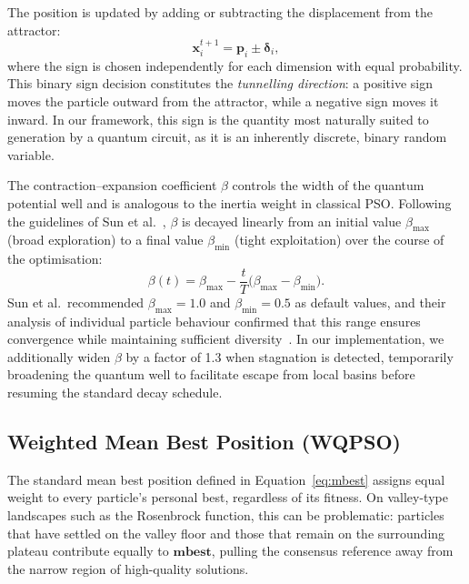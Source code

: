 The position is updated by adding or subtracting the displacement from the
attractor:
\begin{equation}
  \mathbf{x}_i^{t+1} = \mathbf{p}_i \pm \boldsymbol{\delta}_i,
  \label{eq:qpso_update}
\end{equation}
where the sign is chosen independently for each dimension with equal
probability.  This binary sign decision constitutes the \emph{tunnelling
direction}: a positive sign moves the particle outward from the attractor,
while a negative sign moves it inward.  In our framework, this sign is the
quantity most naturally suited to generation by a quantum circuit, as it is an
inherently discrete, binary random variable.

The contraction--expansion coefficient $\beta$ controls the width of the
quantum potential well and is analogous to the inertia weight in classical PSO.
Following the guidelines of Sun et al.~\cite{Sun2012}, $\beta$ is decayed
linearly from an initial value $\beta_{\max}$ (broad exploration) to a final
value $\beta_{\min}$ (tight exploitation) over the course of the optimisation:
\begin{equation}
  \beta(t) = \beta_{\max}
    - \frac{t}{T}\bigl(\beta_{\max} - \beta_{\min}\bigr).
  \label{eq:beta_decay}
\end{equation}
Sun et al.\ recommended $\beta_{\max} = 1.0$ and $\beta_{\min} = 0.5$ as
default values, and their analysis of individual particle behaviour confirmed
that this range ensures convergence while maintaining sufficient
diversity~\cite{Sun2012}.  In our implementation, we additionally widen $\beta$
by a factor of 1.3 when stagnation is detected, temporarily broadening the
quantum well to facilitate escape from local basins before resuming the
standard decay schedule.


\subsection{Weighted Mean Best Position (WQPSO)}
\label{sec:bg:wqpso}

The standard mean best position defined in Equation~\eqref{eq:mbest} assigns
equal weight to every particle's personal best, regardless of its fitness.  On
valley-type landscapes such as the Rosenbrock function, this can be
problematic: particles that have settled on the valley floor and those that
remain on the surrounding plateau contribute equally to $\mathbf{mbest}$,
pulling the consensus reference away from the narrow region of high-quality
solutions.

